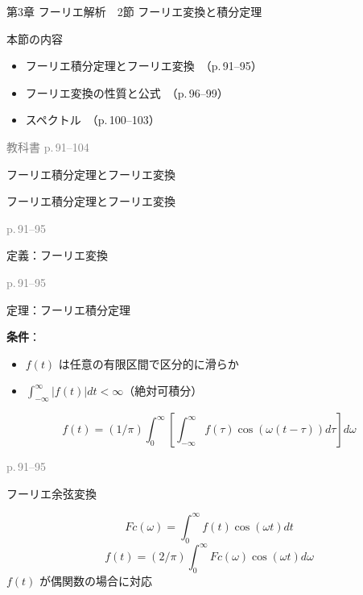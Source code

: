 \documentclass[aspectratio=43,professionalfonts,handout]{beamer}
\begin{document}
\begin{frame}{第3章 フーリエ解析　2節 フーリエ変換と積分定理}
  \begin{block}{本節の内容}
  \begin{itemize}
    \item フーリエ積分定理とフーリエ変換　（p.\,91--95）
    \item フーリエ変換の性質と公式　（p.\,96--99）
    \item スペクトル　（p.\,100--103）
  \end{itemize}
  \end{block}
  \vfill\hfill{\scriptsize \textcolor{gray}{教科書 p.\,91--104}}
\end{frame}

\begin{frame}{フーリエ積分定理とフーリエ変換}
  \begin{block}{}
  {\large フーリエ積分定理とフーリエ変換}
  \end{block}
  \vfill\hfill{\scriptsize \textcolor{gray}{p.\,91--95}}
\end{frame}

\begin{frame}{定義：フーリエ変換}
  \begin{block}{}
  \end{block}
  \vfill\hfill{\scriptsize \textcolor{gray}{p.\,91--95}}
\end{frame}

\begin{frame}{定理：フーリエ積分定理}
  \begin{block}{}
  \textbf{条件}：
  \begin{itemize}
    \item $f(t)$ は任意の有限区間で区分的に滑らか
    \item $\int_{-\infty}^{\infty} |f(t)| dt < \infty$（絶対可積分）
  \end{itemize}
  \[
    f(t) = (1/\pi) \int_{0}^\infty [\int_{-\infty}^{\infty} f(\tau)\cos(\omega(t-\tau)) d\tau] d\omega

  \]
  \end{block}
  \vfill\hfill{\scriptsize \textcolor{gray}{p.\,91--95}}
\end{frame}

\begin{frame}{フーリエ余弦変換}
  \begin{block}{}
  \[
    Fc(\omega) = \int_{0}^\infty f(t)\cos(\omega t) dt
  \]
  \[
    f(t) = (2/\pi) \int_{0}^\infty Fc(\omega)\cos(\omega t) d\omega
  \]
  {\footnotesize $f(t)$ が偶関数の場合に対応}
  \end{block}
\end{frame}
\end{document}
